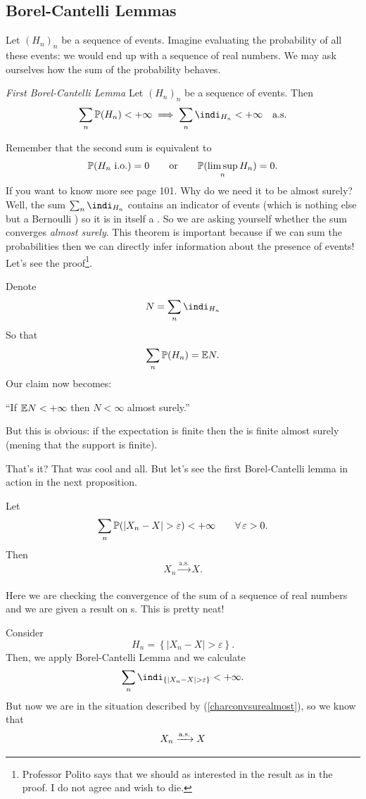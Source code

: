 \documentclass{report}
\begin{document}
\subsection{Borel-Cantelli Lemmas}
Let ${(H_n)}_{n}$ be a sequence of events. Imagine evaluating the probability of all these events: we would end up with a sequence of real numbers. We may ask ourselves how the sum of the probability behaves.
\begin{theorem}
	\emph{First Borel-Cantelli Lemma}
	Let ${(H_n)}_{n}$ be a sequence of events. Then
	\[\sum_n\pr(H_n)<+\infty\implies\sum_n\indi_{H_n}<+\infty\quad\text{a.s.}\]
\end{theorem}
Remember that the second sum is equivalent to
\[\mathbb{P}(H_n\text{ i.o.})=0\qquad\text{or}\qquad\mathbb{P}(\limsup_n H_n)=0.\]
If you want to know more see \cinlar page 101.
Why do we need it to be almost surely? Well, the sum $\sum_n\indi_{H_n}$ contains an indicator of events (which is nothing else but a Bernoulli \rv) so it is in itself a \rv. So we are asking yourself whether the sum converges \textit{almost surely}. This theorem is important because if we can sum the probabilities then we can directly infer information about the presence of events! Let's see the proof\footnote{Professor Polito says that we should as interested in the result as in the proof. I do not agree and wish to die.}.
\begin{fancyproof}
	Denote
	\[N=\sum_n\indi_{H_n}\]
	So that
	\[\sum_n\mathbb{P}(H_n)=\mathbb{E} N.\]
	Our claim now becomes:
	\begin{center}
		``If $\mathbb{E} N<+\infty$ then $N<\infty$ almost surely.''
	\end{center}
	But this is obvious: if the expectation is finite then the \rv{} is finite almost surely (mening that the support is finite).
\end{fancyproof}
That's it? That was cool and all. But let's see the first Borel-Cantelli lemma in action in the next proposition.
\begin{proposition}
	Let
	\[\sum_n\pr(|X_n-X|>\varepsilon)<+\infty\qquad\every\varepsilon>0.\]
	Then 
	\[X_n\xrightarrow[]{\text{a.s.}}X.\]
\end{proposition}
Here we are checking the convergence of the sum of a sequence of real numbers and we are given a result on \rv s. This is pretty neat!
\begin{fancyproof}
	Consider
	\[H_n=\left\{|X_n-X|>\varepsilon\right\}.\]
	Then, we apply Borel-Cantelli Lemma and we calculate
	\[\sum_n\indi_{\left\{|X_n-X|>\varepsilon\right\}}<+\infty.\]
	But now we are in the situation described by (\ref{charconvsurealmost}), so we know that
	\[X_n\xrightarrow[]{\text{a.s.}} X\]
\end{fancyproof}
\end{document}
